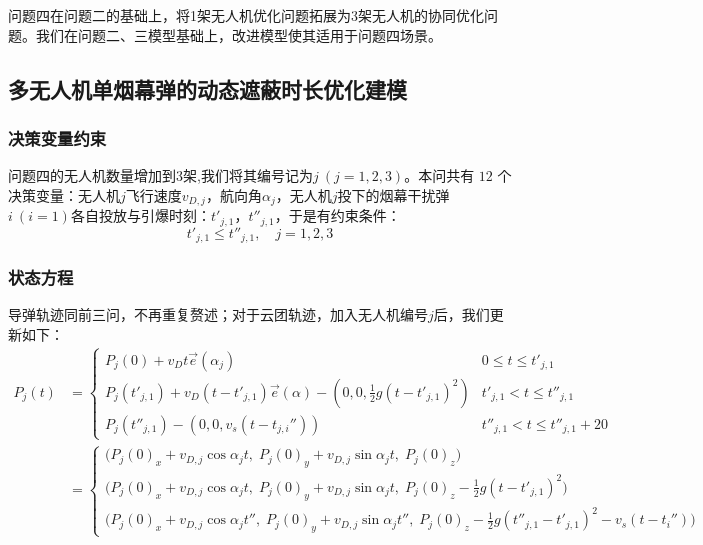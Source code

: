 \documentclass[withoutpreface,bwprint]{cumcmthesis}
\numberwithin{equation}{section} %
\numberwithin{figure}{section} %
\numberwithin{table}{section}  %
\begin{document}
问题四在问题二的基础上，将1架无人机优化问题拓展为3架无人机的协同优化问题。我们在问题二、三模型基础上，改进模型使其适用于问题四场景。
\subsection{多无人机单烟幕弹的动态遮蔽时长优化建模}
\subsubsection{决策变量约束}

问题四的无人机数量增加到3架,我们将其编号记为$j~(j=1,2,3)$。本问共有 $ 12$ 个决策变量：无人机$j$飞行速度$v_{D,j}$，航向角$\alpha_j$，无人机$j$投下的烟幕干扰弹$i~(i=1)$各自投放与引爆时刻：$t'_{j,1}$，$t''_{j,1}$，于是有约束条件：
\begin{equation}
    t'_{j,1}\le t''_{j,1},\quad  j=1,2,3
\end{equation}

\vspace{-2em}
\subsubsection{状态方程}
导弹轨迹同前三问，不再重复赘述；对于云团轨迹，加入无人机编号$j$后，我们更新如下：\\
\begin{equation}
\begin{split}
{P}_{j}(t)& = 
\begin{cases}
    P_{j}(0)+v_Dt\vec{e}(\alpha_j) & 0 \le t \le t'_{j,1} \\
    {P}_{j}(t'_{j,1}) + v_D (t - t'_{j,1}) \vec{e}(\alpha) - (0, 0, \frac{1}{2}g(t - t'_{j,1})^2) &t'_{j,1} < t \le t''_{j,1} \\
    {P}_{j}(t''_{j,1})-(0,0,v_s(t-t_{j,i}'')) &  t''_{j,1} < t \le t''_{j,1} + 20
\end{cases}\\
&=\begin{cases}
\bigl(P_{j}(0)_x\!+\!v_{D,j}\cos{\alpha_j}t,\; P_{j}(0)_y\!+\!v_{D,j}\sin{\alpha_j}t,\; P_{j}(0)_z\bigr) & \\[0.3ex]
\bigl(P_{j}(0)_x\!+\!v_{D,j}\cos{\alpha_j}t,\; P_{j}(0)_y\!+\!v_{D,j}\sin{\alpha_j}t,\; P_{j}(0)_z\!-\!\tfrac{1}{2}g(t\!-\!t'_{j,1})^2\bigr) & \\[0.3ex]
\bigl(P_{j}(0)_x\!+\!v_{D,j}\cos{\alpha_j}t'',\; P_{j}(0)_y\!+\!v_{D,j}\sin{\alpha_j}t'',\; P_{j}(0)_z\!-\!\tfrac{1}{2}g(t''_{j,1}\!-\!t'_{j,1})^2\!-\!v_s(t\!-\!t_i'')\bigr) &
\end{cases}
\end{split}
\end{equation}
\end{document}
